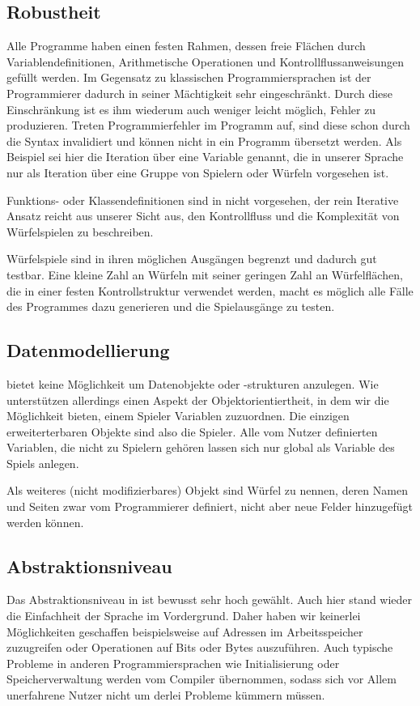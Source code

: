 \subsection{Robustheit} %
\label{sub:robustheit}
Alle \dg Programme haben einen festen Rahmen, dessen freie Flächen durch Variablendefinitionen, Arithmetische Operationen und Kontrollflussanweisungen gefüllt werden. Im Gegensatz zu klassischen Programmiersprachen ist der Programmierer dadurch in seiner Mächtigkeit sehr eingeschränkt. Durch diese Einschränkung ist es ihm wiederum auch weniger leicht möglich, Fehler zu produzieren. Treten Programmierfehler im \dg Programm auf, sind diese schon durch die Syntax invalidiert und können nicht in ein Programm übersetzt werden. Als Beispiel sei hier die Iteration über eine Variable genannt, die in unserer Sprache nur als Iteration über eine Gruppe von Spielern oder Würfeln vorgesehen ist. 

Funktions- oder Klassendefinitionen sind in \dg nicht vorgesehen, der rein Iterative Ansatz reicht aus unserer Sicht aus, den Kontrollfluss und die Komplexität von Würfelspielen zu beschreiben.

Würfelspiele sind in ihren möglichen Ausgängen begrenzt und dadurch gut testbar. Eine kleine Zahl an Würfeln mit seiner geringen Zahl an Würfelflächen, die in einer festen Kontrollstruktur verwendet werden, macht es möglich alle Fälle des Programmes dazu generieren und die Spielausgänge zu testen.

\subsection{Datenmodellierung} %
\label{sub:datenmodellierung}
\dg bietet keine Möglichkeit um Datenobjekte oder -strukturen anzulegen. Wie unterstützen allerdings einen Aspekt der Objektorientiertheit, in dem wir die Möglichkeit bieten, einem Spieler Variablen zuzuordnen. Die einzigen erweiterterbaren Objekte sind also die Spieler. Alle vom Nutzer definierten Variablen, die nicht zu Spielern gehören lassen sich nur global als Variable des Spiels anlegen.

Als weiteres (nicht modifizierbares) Objekt sind Würfel zu nennen, deren Namen und Seiten zwar vom Programmierer definiert, nicht aber neue Felder hinzugefügt werden können.

\subsection{Abstraktionsniveau} %
\label{sub:abstraktionsniveau}
	Das Abstraktionsniveau in \dg ist bewusst sehr hoch gewählt. Auch hier stand wieder die Einfachheit der Sprache im Vordergrund. Daher haben wir keinerlei Möglichkeiten geschaffen beispielsweise auf Adressen im Arbeitsspeicher zuzugreifen oder Operationen auf Bits oder Bytes auszuführen. Auch typische Probleme in anderen Programmiersprachen wie Initialisierung oder Speicherverwaltung werden vom Compiler übernommen, sodass sich vor Allem unerfahrene Nutzer nicht um derlei Probleme kümmern müssen. 

